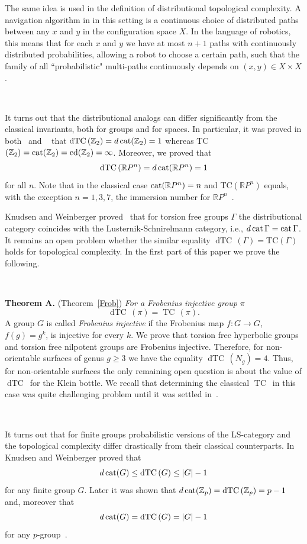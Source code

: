 \documentclass{amsart}
\numberwithin{equation}{section}
\theoremstyle{plain}
\theoremstyle{definition}
\def\TC{{\mathop\mathrm{TC}\,}}
\def\dTC{{\mathop\mathrm{dTC}\,}}
\def\cat{\protect\operatorname{cat}}
\def\cd{\protect\operatorname{cd}}
\begin{document}
The same idea is used in the definition of distributional topological complexity. A navigation algorithm in in this setting is a continuous choice of distributed paths between any $x$ and $y$ in the configuration space $X$. In the language of robotics, this means that
for each $x$ and $y$ we have at most $n+1$ paths with continuously distributed probabilities, allowing a robot to choose a certain path, such that the family of all ``probabilistic" multi-paths continuously depends on $(x,y)\in X\times X$.

\

It turns out that the distributional analogs can differ significantly from the classical invariants, both for groups and for spaces.
In particular, it was proved in both~\cite{DJ} and ~\cite{KW1} that $\dTC(\mathbb Z_2)=d\cat(\mathbb Z_2)=1$ whereas TC$(\mathbb Z_2)=\cat(\mathbb Z_2)=\cd(\mathbb Z_2)=\infty$. Moreover, we proved that $$\dTC(\mathbb RP^n)=d\cat(\mathbb RP^n)=1$$ for all $n$. Note that in the classical case $\cat(\mathbb RP^n)=n$
and TC$(\mathbb RP^n)$ equals, with the exception $n=1,3,7$, the immersion number for $\mathbb RP^n$~\cite{FTY}.


Knudsen and Weinberger proved~\cite{KW1} that for torsion free groups $\Gamma$ the distributional category coincides with the Lusternik-Schnirelmann category, i.e., $d\cat\Gamma=\cat\Gamma$.
It remains an open problem whether the similar equality $\dTC(\Gamma)=$TC$(\Gamma)$ holds for topological complexity. 
In the first part of this paper we prove the following. 

\

{\bf Theorem A.} (Theorem~\ref{Frob}) {\em For a Frobenius injective group} $\pi$  $$\dTC(\pi)=\TC(\pi).$$
A group $G$ is called {\em Frobenius injective} if the  Frobenius map $f:G\to G$, $f(g)=g^k$, is injective for every $k$.
We prove that  torsion free hyperbolic groups and torsion free nilpotent groups are Frobenius injective.
Therefore, for non-orientable surfaces of genus $g\ge 3$ we have the equality $\dTC(N_g)=4$.
Thus, for non-orientable surfaces the only remaining open question is about the value of $\dTC$ for the Klein bottle.
We recall that determining the classical $\TC$ in this case was quite challenging problem until it was settled in~\cite{CV}.

\

It turns out that for finite groups probabilistic versions of the LS-category and the topological complexity differ drastically from their classical counterparts.
In~\cite{KW1} Knudsen and Weinberger proved that
$$d\cat(G)\le \dTC(G)\le|G|-1$$ for any finite group $G$. Later it was shown that $d\cat(\mathbb Z_p)=\dTC(\mathbb Z_p)=p-1$~\cite{Dr2} and, moreover that $$d\cat(G)=\dTC(G)=|G|-1$$ for any $p$-group~\cite{KW2}.  
\end{document}
